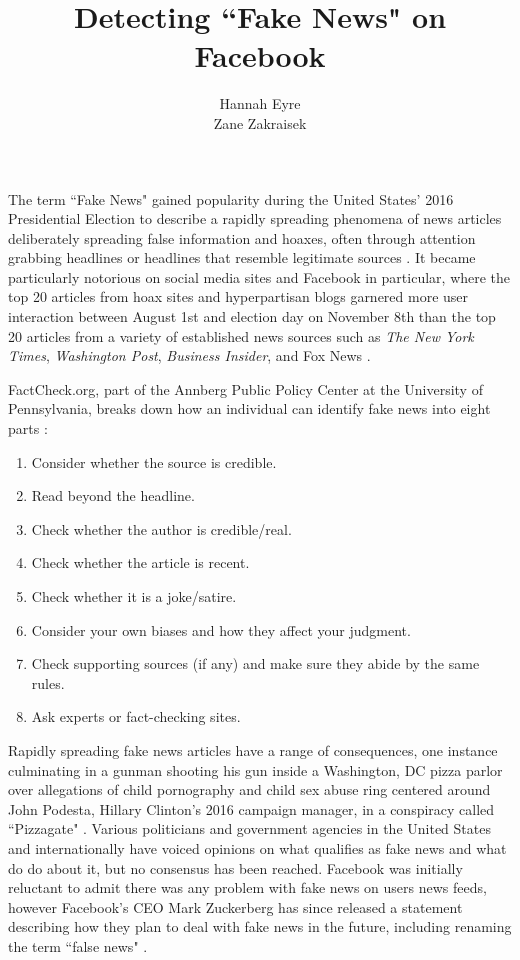 \documentclass[11pt]{article}
\title{Detecting ``Fake News" on Facebook}
\author{Hannah Eyre\\
	Zane Zakraisek}
\begin{document}
\maketitle

The term ``Fake News" gained popularity during the United States' 2016 Presidential Election to describe a rapidly spreading phenomena of news articles deliberately spreading false information and hoaxes, often through attention grabbing headlines or headlines that resemble legitimate sources \cite{guardian}. It became particularly notorious on social media sites and Facebook in particular, where the top 20 articles from hoax sites and hyperpartisan blogs garnered more user interaction between August 1st and election day on November 8th than the top 20 articles from a variety of established news sources such as {\it The New York Times}, {\it Washington Post}, {\it Business Insider}, and Fox News \cite{buzzfeed}.

FactCheck.org, part of the Annberg Public Policy Center at the University of Pennsylvania, breaks down how an individual can identify fake news into eight parts \cite{factcheck}:
\begin{enumerate}
\item Consider whether the source is credible.
\item Read beyond the headline.
\item Check whether the author is credible/real.
\item Check whether the article is recent.
\item Check whether it is a joke/satire.
\item Consider your own biases and how they affect your judgment.
\item Check supporting sources (if any) and make sure they abide by the same rules.
\item Ask experts or fact-checking sites.
\end{enumerate}

Rapidly spreading fake news articles have a range of consequences, one instance culminating in a gunman shooting his gun inside a Washington, DC pizza parlor over allegations of child pornography and child sex abuse ring centered around John Podesta, Hillary Clinton's 2016 campaign manager, in a conspiracy called ``Pizzagate" \cite{pizzagate}. Various politicians and government agencies in the United States and internationally have voiced opinions on what qualifies as fake news and what do do about it, but no consensus has been reached. Facebook was initially reluctant to admit there was any problem with fake news on users news feeds, however Facebook's CEO Mark Zuckerberg has since released a statement describing how they plan to deal with fake news in the future, including renaming the term ``false news" \cite{zuckerberg}.
\end{document}
